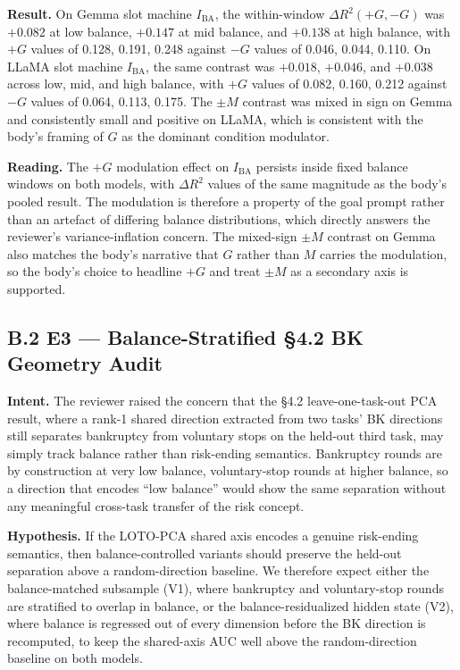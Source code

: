 \documentclass[11pt,a4paper]{article}
\begin{document}
\textbf{Result.} On Gemma slot machine $I_\text{BA}$, the within-window $\Delta R^2(+G, -G)$ was $+0.082$ at low balance, $+0.147$ at mid balance, and $+0.138$ at high balance, with $+G$ values of 0.128, 0.191, 0.248 against $-G$ values of 0.046, 0.044, 0.110. On LLaMA slot machine $I_\text{BA}$, the same contrast was $+0.018$, $+0.046$, and $+0.038$ across low, mid, and high balance, with $+G$ values of 0.082, 0.160, 0.212 against $-G$ values of 0.064, 0.113, 0.175. The $\pm M$ contrast was mixed in sign on Gemma and consistently small and positive on LLaMA, which is consistent with the body's framing of $G$ as the dominant condition modulator.

\textbf{Reading.} The $+G$ modulation effect on $I_\text{BA}$ persists inside fixed balance windows on both models, with $\Delta R^2$ values of the same magnitude as the body's pooled result. The modulation is therefore a property of the goal prompt rather than an artefact of differing balance distributions, which directly answers the reviewer's variance-inflation concern. The mixed-sign $\pm M$ contrast on Gemma also matches the body's narrative that $G$ rather than $M$ carries the modulation, so the body's choice to headline $+G$ and treat $\pm M$ as a secondary axis is supported.

\subsection*{B.2 E3 --- Balance-Stratified \S4.2 BK Geometry Audit}

\textbf{Intent.} The reviewer raised the concern that the \S4.2 leave-one-task-out PCA result, where a rank-1 shared direction extracted from two tasks' BK directions still separates bankruptcy from voluntary stops on the held-out third task, may simply track balance rather than risk-ending semantics. Bankruptcy rounds are by construction at very low balance, voluntary-stop rounds at higher balance, so a direction that encodes ``low balance'' would show the same separation without any meaningful cross-task transfer of the risk concept.

\textbf{Hypothesis.} If the LOTO-PCA shared axis encodes a genuine risk-ending semantics, then balance-controlled variants should preserve the held-out separation above a random-direction baseline. We therefore expect either the balance-matched subsample (V1), where bankruptcy and voluntary-stop rounds are stratified to overlap in balance, or the balance-residualized hidden state (V2), where balance is regressed out of every dimension before the BK direction is recomputed, to keep the shared-axis AUC well above the random-direction baseline on both models.
\end{document}
